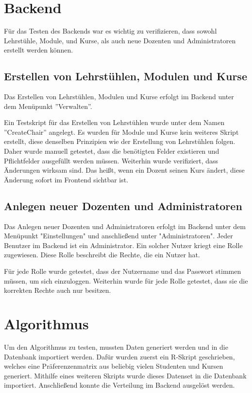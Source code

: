 	\section{Backend}
	
		Für das Testen des Backends war es wichtig zu verifizieren, dass sowohl Lehrstühle, Module, und Kurse, als auch neue Dozenten und Administratoren erstellt werden können.
		
		\subsection{Erstellen von Lehrstühlen, Modulen und Kurse}
			
			Das Erstellen von Lehrstühlen, Modulen und Kurse erfolgt im Backend unter dem Menüpunkt ''Verwalten''.\newline
			
			Ein Testskript für das Erstellen von Lehrstühlen wurde unter dem Namen ''CreateChair'' angelegt.
			Es wurden für Module und Kurse kein weiteres Skript erstellt, diese denselben Prinzipien wie der Erstellung von Lehrstühlen folgen.
			Daher wurde manuell getestet, dass die benötigten Felder existieren und Pflichtfelder ausgefüllt werden müssen.
			Weiterhin wurde verifiziert, dass Änderungen wirksam sind.
			Das heißt, wenn ein Dozent seinen Kurs ändert, diese Änderung sofort im Frontend sichtbar ist.
			
		\subsection{Anlegen neuer Dozenten und Administratoren}
		
			Das Anlegen neuer Dozenten und Administratoren erfolgt im Backend unter dem Menüpunkt "Einstellungen" und anschließend unter "Administratoren".
			Jeder Benutzer im Backend ist ein Administrator.
			Ein solcher Nutzer kriegt eine Rolle zugewiesen.
			Diese Rolle beschreibt die Rechte, die ein Nutzer hat.\newline
			
			Für jede Rolle wurde getestet, dass der Nutzername und das Passwort stimmen müssen, um sich einzuloggen.
			Weiterhin wurde für jede Rolle getestet, dass sie die korrekten Rechte auch nur besitzen.
	
	\section{Algorithmus}
	
		Um den Algorithmus zu testen, mussten Daten generiert werden und in die Datenbank importiert werden.
		Dafür wurden zuerst ein R-Skript geschrieben, welches eine Präferenzenmatrix aus beliebig vielen Studenten und Kursen generiert.
		Mithilfe eines weiteren Skripts wurde dieses Datenset in die Datenbank importiert.
		Anschließend konnte die Verteilung im Backend ausgelöst werden.\newline
		
